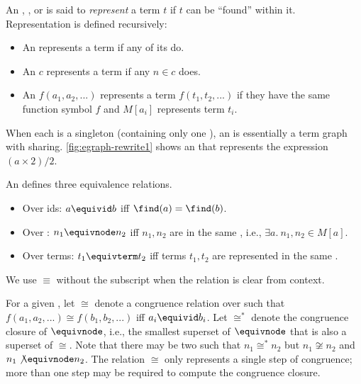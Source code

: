 \begin{definition}
  An \egraph, \eclass, or \enode is said to \textit{represent} a term $t$ if $t$ can be
    ``found'' within it. Representation is defined recursively:
  \begin{itemize}
    \item An \egraph represents a term if any of its \eclasses do.
    \item An \eclass $c$ represents a term if any \enode $n \in c$ does.
    \item An \enode $f(a_{1}, a_{2}, ...)$ represents a term $f(t_{1}, t_{2}, ...)$
          if they have the same function symbol $f$
          and \eclass $M[a_{i}]$ represents term $t_{i}$.
  \end{itemize}

  When each \eclass is a singleton (containing only one \enode),
    an \egraph is essentially a term graph with sharing.
  \autoref{fig:egraph-rewrite1} shows an \egraph that represents the
    expression $(a \times 2) / 2$.
\end{definition}

\begin{definition}[Equivalence]
  An \egraph defines three equivalence relations.
  \begin{itemize}
    \item Over \eclass ids: $a \equivid b$ iff $\find(a) = \find(b)$.
    \item Over \enodes: $n_{1} \equivnode n_{2}$ iff \enodes $n_{1}, n_{2}$ are in the same \eclass, 
          i.e., $\exists a.\ n_{1}, n_{2} \in M[a]$.
    \item Over terms: $t_{1} \equivterm t_{2}$ iff terms $t_{1}, t_{2}$ are represented in the same \eclass.
  \end{itemize}

  We use $\equiv$ without the subscript when the relation is clear from context.
\end{definition}

\begin{definition}[Congruence]
  For a given \egraph, let $\cong$ denote a congruence relation over \enodes such that
  ${f(a_{1}, a_{2}, ...) \cong f(b_{1}, b_{2}, ...)}$ iff $a_{i} \equivid b_{i}$.
  Let $\cong^{*}$ denote the congruence closure of $\equivnode$,
   i.e., the smallest superset of $\equivnode$ that is also a superset of $\cong$.
  Note that there may be two \enodes such that
    $n_{1} \cong^{*} n_{2}$ but
    $n_{1} \not\cong n_{2}$ and
    $n_{1} \not\equivnode n_{2}$.
  The relation $\cong$ only represents a single step of congruence;
  more than one step may be required to compute the congruence closure.
\end{definition}

